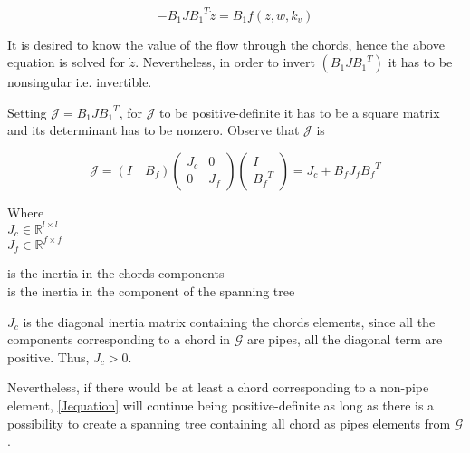 \begin{equation}
 - B_1 J {B_1}^T \dot{z}  = B_1 f(z, w, k_v)
 \end{equation}

It is desired to know the value of the flow through the chords, hence the above equation is solved 
for $\dot{z}$. Nevertheless, in order to invert $(B_1 J {B_1}^T)$ it has to be nonsingular i.e. invertible. 

Setting $\mathcal{J} = B_1 J {B_1}^T $, for $\mathcal{J}$ to be positive-definite it has to be a square matrix and its 
determinant has to be nonzero. Observe that $\mathcal{J}$ is

\begin{equation}
  \label{Jequation}
  \mathcal{J} = (I \quad B_f) 
  \begin{pmatrix}
    J_c    &    0    \\
    0       &    J_f
  \end{pmatrix}
  \begin{pmatrix}
    I    \\
    {B_f}^T
  \end{pmatrix}
  = J_c + B_f J_f {B_f}^T
\end{equation}

\begin{minipage}[t]{0.20\textwidth}
Where\\
\hspace*{8mm} $J_c \in \mathbb{R}^{l \times l}$  \\
\hspace*{8mm} $J_f \in \mathbb{R}^{f \times f} $ 
\end{minipage}
\begin{minipage}[t]{0.68\textwidth}
\vspace*{2mm}
\hspace*{4mm} is the inertia in the chords components\\
\hspace*{4mm} is the inertia in the component of the spanning tree 
\end{minipage}

$J_c$ is the diagonal inertia matrix containing the chords elements,  since all 
the components corresponding to a chord in $\mathcal{G}$ are pipes, all the 
diagonal term are positive. Thus, $J_c > 0$. 

Nevertheless, if there would be at least a chord corresponding to a non-pipe element, \eqref{Jequation} 
will continue being positive-definite as long as there is a possibility to create a spanning tree containing all 
chord as pipes elements from $\mathcal{G}$ \cite{TowerModel}.

